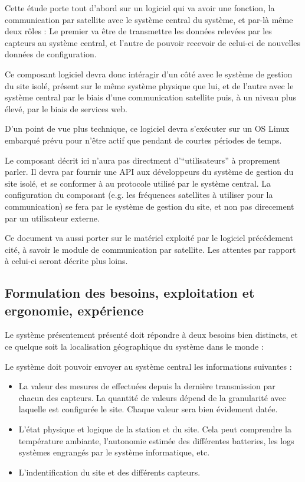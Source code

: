 Cette étude porte tout d'abord sur un logiciel qui va avoir une fonction, la communication par satellite avec le système central du système, et par-là même deux rôles : Le premier va être de transmettre les données relevées par les capteurs au système central, et l'autre de pouvoir recevoir de celui-ci de nouvelles données de configuration.

Ce composant logiciel devra donc intéragir d'un côté avec le système de gestion du site isolé, présent sur le même système physique que lui, et de l'autre avec le système central par le biais d'une communication satellite puis, à un niveau plus élevé, par le biais de services web.

D'un point de vue plus technique, ce logiciel devra s'exécuter sur un OS Linux embarqué prévu pour n'être actif que pendant de courtes périodes de temps.

Le composant décrit ici n'aura pas directment d'``utilisateurs'' à proprement parler. Il devra par fournir une API aux développeurs du système de gestion du site isolé, et se conformer à au protocole utilisé par le système central. La configuration du composant (e.g. les fréquences satellites à utiliser pour la communication) se fera par le système de gestion du site, et non pas direcement par un utilisateur externe.

Ce document va aussi porter sur le matériel exploité par le logiciel précédement cité, à savoir le module de communication par satellite. Les attentes par rapport à celui-ci seront décrite plus loins.

\subsection{Formulation des besoins, exploitation et ergonomie, expérience}

Le système présentement présenté doit répondre à deux besoins bien distincts, et ce quelque soit la localisation géographique du système dans le monde :

 Le système doit pouvoir envoyer au système central les informations suivantes :

\begin{itemize}
\item La valeur des mesures de effectuées depuis la dernière transmission par chacun des capteurs. La quantité de valeurs dépend de la granularité avec laquelle est configurée le site. Chaque valeur sera bien évidement datée.
\item L'état physique et logique de la station et du site. Cela peut comprendre la température ambiante, l'autonomie estimée des différentes batteries, les logs systèmes engrangés par le système informatique, etc.
\item L'indentification du site et des différents capteurs. %
\end{itemize}

